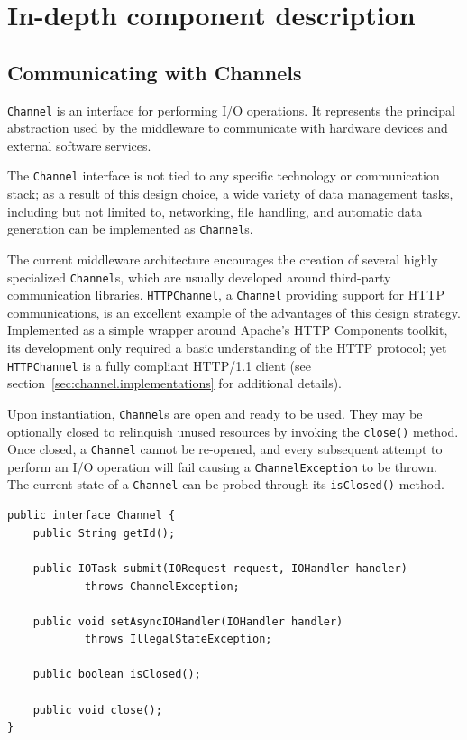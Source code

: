 \chapter{In-depth component description}

\section{Communicating with Channels}

\texttt{Channel} is an interface for performing I/O operations. It represents the principal abstraction used by the middleware to communicate with hardware devices and external software services.

The \texttt{Channel} interface is not tied to any specific technology or communication stack; as a result of this design choice, a wide variety of data management tasks, including but not limited to, networking, file handling, and automatic data generation can be implemented as \texttt{Channel}s.

The current middleware architecture encourages the creation of several highly specialized \texttt{Channel}s, which are usually developed around third-party communication libraries. \texttt{HTTPChannel}, a \texttt{Channel} providing support for HTTP communications, is an excellent example of the advantages of this design strategy. Implemented as a simple wrapper around Apache's HTTP Components toolkit, its development only required a basic understanding of the HTTP protocol; yet \texttt{HTTPChannel} is a fully compliant HTTP/1.1 client (see section~\ref{sec:channel.implementations} for additional details).

Upon instantiation, \texttt{Channel}s are open and ready to be used. They may be optionally closed to relinquish unused resources by invoking the \texttt{close()} method. Once closed, a \texttt{Channel} cannot be re-opened, and every subsequent attempt to perform an I/O operation will fail causing a \texttt{ChannelException} to be thrown. The current state of a \texttt{Channel} can be probed through its \texttt{isClosed()} method.

\lstset{language=Java}
\begin{lstlisting}[float,floatplacement=H,caption=The Channel interface,label={lst:channel}]
public interface Channel {
	public String getId();
	
	public IOTask submit(IORequest request, IOHandler handler)
			throws ChannelException;
	
	public void setAsyncIOHandler(IOHandler handler)
			throws IllegalStateException;
			
	public boolean isClosed();
	
	public void close();		
}
\end{lstlisting}

